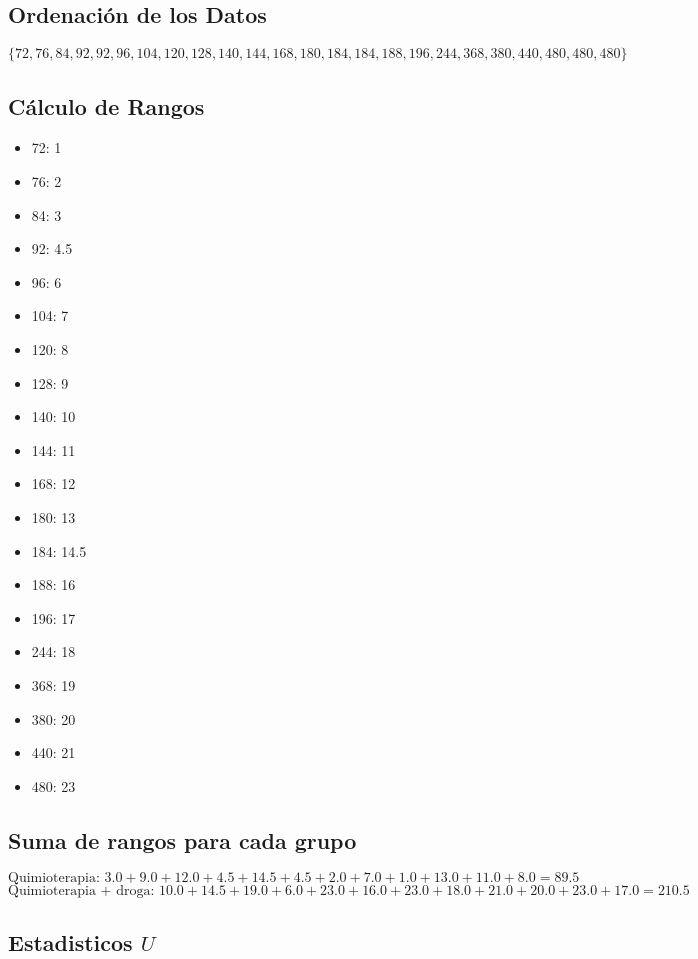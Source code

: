 \documentclass{article}
\begin{document}
\subsection*{Ordenación de los Datos}

\[ \{ 72, 76, 84, 92, 92, 96, 104, 120, 128, 140, 144, 168, 180, 184, 184, 188, 196, 244, 368, 380, 440, 480, 480, 480 \} \]

\subsection*{Cálculo de Rangos}

\begin{itemize}
    \item 72: 1
    \item 76: 2
    \item 84: 3
    \item 92: 4.5
    \item 96: 6
    \item 104: 7
    \item 120: 8
    \item 128: 9
    \item 140: 10
    \item 144: 11
    \item 168: 12
    \item 180: 13
    \item 184: 14.5
    \item 188: 16
    \item 196: 17
    \item 244: 18
    \item 368: 19
    \item 380: 20
    \item 440: 21
    \item 480: 23
\end{itemize}

\subsection*{Suma de rangos para cada grupo}
\[ \text{Quimioterapia: } 3.0 + 9.0 + 12.0 + 4.5+ 14.5+ 4.5+ 2.0+ 7.0+ 1.0+ 13.0+ 11.0+ 8.0 = 89.5 \]
\[ \text{Quimioterapia + droga: } 10.0+ 14.5+ 19.0+ 6.0+ 23.0+ 16.0+ 23.0+ 18.0+ 21.0+ 20.0+ 23.0+ 17.0 = 210.5\]

\subsection*{Estadisticos $U$}
\end{document}
